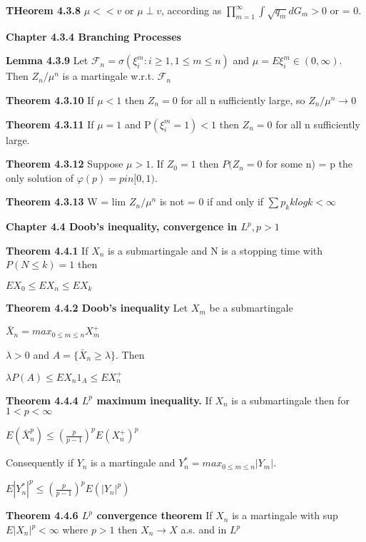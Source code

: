\documentclass{article}
\begin{document}
\textbf {THeorem 4.3.8} $\mu << v$ or $\mu \perp v$, according as $\prod_{m=1}^{\infty} \int \sqrt{q_m} dG_m > 0$ or = 0.

\textbf {Chapter 4.3.4 Branching Processes}

\textbf {Lemma 4.3.9} Let $\mathcal{F}_n = \sigma (\xi_i^m : i \geq 1, 1 \leq m \leq n)$ and $\mu = E \xi_i^m \in (0, \infty)$. Then $Z_n / \mu^n$ is a martingale w.r.t. $\mathcal{F}_n$

\textbf {Theorem 4.3.10} If $\mu < 1$ then $Z_n = 0$ for all n sufficiently large, so $Z_n / \mu^n \to 0$

\textbf {Theorem 4.3.11} If $\mu = 1$ and P$(\xi_i^m = 1) < 1$ then $Z_n = 0$ for all n sufficiently large.

\textbf {Theorem 4.3.12} Suppose $\mu > 1$. If $Z_0 = 1$ then $P(Z_n = 0$ for some n) = p the only solution of $\varphi(p) = p in [0,1)$.

\textbf {Theorem 4.3.13} W = lim $Z_n / \mu^n$ is not = 0 if and only if $\sum p_k k log k < \infty$

\textbf {Chapter 4.4 Doob's inequality, convergence in $L^p, p > 1$}

\textbf {Theorem 4.4.1} If $X_n$ is a submartingale and N is a stopping time with $P(N \leq k) = 1$ then
\begin{center}
$EX_0 \leq EX_n \leq EX_k$
\end{center}

\textbf {Theorem 4.4.2 Doob's inequality} Let $X_m$ be a submartingale
\begin{center}
$\bar{X}_n = max_{0 \leq m \leq n} X_m^+$
\end{center}
$\lambda > 0$ and $A = \{ \bar{X}_n \geq \lambda \}$. Then
\begin{center}
$\lambda P(A) \leq EX_n 1_A \leq EX_n^+$
\end{center}

\textbf {Theorem 4.4.4 $L^p$ maximum inequality.} If $X_n$ is a submartingale then for $1 < p < \infty$
\begin{center}
$E(\bar{X}_n^p) \leq (\frac{p}{p-1})^p E(X_n^+)^p$
\end{center}
Consequently if $Y_n$ is a martingale and $Y_n^* = max_{0 \leq m \leq n} |Y_m|$.
\begin{center}
$E|Y_n^*|^p \leq (\frac{p}{p-1})^p E(|Y_n|^p)$
\end{center}

\textbf {Theorem 4.4.6 $L^p$ convergence theorem} If $X_n$ is a martingale with sup $E|X_n|^p < \infty$ where $p > 1$ then $X_n \to X$ a.s. and in $L^p$
\end{document}
